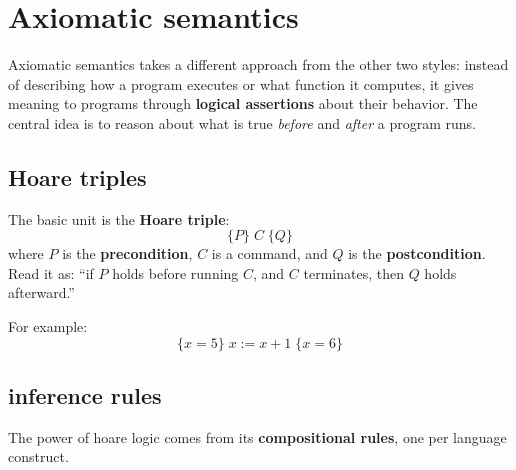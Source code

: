 \section{Axiomatic semantics}
Axiomatic semantics takes a different approach from the other two styles: instead of describing how a program executes or what function it computes, it gives meaning to programs through \textbf{logical assertions} about their behavior. The central idea is to reason about what is true \emph{before} and \emph{after} a program runs.

\subsection{Hoare triples}
The basic unit is the \textbf{Hoare triple}:
\[
  \{P\}\; C\; \{Q\}
\]
where $P$ is the \textbf{precondition}, $C$ is a command, and $Q$ is the \textbf{postcondition}. Read it as: ``if $P$ holds before running $C$, and $C$ terminates, then $Q$ holds afterward.''

For example:
\[
  \{x = 5\}\; x := x + 1\; \{x = 6\}
\]

\subsection{inference rules}
The power of hoare logic comes from its \textbf{compositional rules}, one per language construct.

